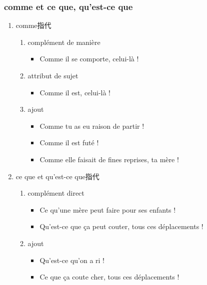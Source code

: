 \documentclass[UTF8]{report}
\begin{document}
\subsubsection{comme et ce que, qu’est-ce que}
\begin{enumerate}
    \item comme指代
    \begin{enumerate}
        \item complément de manière
        \begin{itemize}
            \item Comme il se comporte, celui-là !
        \end{itemize}
        \item attribut de sujet
        \begin{itemize}
            \item Comme il est, celui-là !
        \end{itemize}
        \item ajout
        \begin{itemize}
            \item Comme tu as eu raison de partir !
            \item Comme il est futé !
            \item Comme elle faisait de fines reprises, ta mère !
        \end{itemize}
    \end{enumerate}
    \item ce que et qu’est-ce que指代
    \begin{enumerate}
        \item complément direct
        \begin{itemize}
            \item Ce qu’une mère peut faire pour ses enfants !
            \item Qu’est-ce que ça peut couter, tous ces déplacements !
        \end{itemize}
        \item ajout 
        \begin{itemize}
            \item Qu’est-ce qu’on a ri !
            \item Ce que ça coute cher, tous ces déplacements !
        \end{itemize}

    \end{enumerate}
\end{enumerate}
\end{document}
